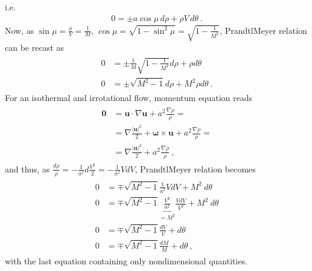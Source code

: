 \documentclass[letterpaper,10pt,english]{jupyterBook}
\begin{document}
\sphinxAtStartPar
i.e.
\begin{equation*}
\begin{split}0 = \pm a \cos \mu \, d \rho + \rho V \, d \theta \ .\end{split}
\end{equation*}
\sphinxAtStartPar
Now, as \(\sin \mu = \frac{a}{V} = \frac{1}{M}\), \(\cos \mu = \sqrt{ 1 - \sin^2 \mu } = \sqrt{ 1 - \frac{1}{M^2} }\), Prandtl\sphinxhyphen{}Meyer relation can be recast as
\begin{equation*}
\begin{split}\begin{aligned}
  0 & = \pm \frac{1}{M} \sqrt{ 1 - \frac{1}{M^2} } d \rho + \rho d \theta \\
  0 & = \pm \sqrt{ M^2 - 1 } d \rho + M^2 \rho d \theta  \ .
\end{aligned}\end{split}
\end{equation*}
\sphinxAtStartPar
For an isothermal and irrotational flow, momentum equation reads
\begin{equation*}
\begin{split}\begin{aligned}
  \mathbf{0}
  & = \mathbf{u} \cdot \nabla \mathbf{u} + a^2 \frac{\nabla \rho}{\rho} = \\
  & = \nabla \frac{|\mathbf{u}|^2}{2} + \boldsymbol\omega \times \mathbf{u} + a^2 \frac{\nabla \rho}{\rho} = \\
  & = \nabla \frac{|\mathbf{u}|^2}{2} + a^2 \frac{\nabla \rho}{\rho} \ ,
\end{aligned}\end{split}
\end{equation*}
\sphinxAtStartPar
and thus, as \(\frac{d \rho}{\rho} = - \frac{1}{a^2} d \frac{V^2}{2} = - \frac{1}{a^2} V dV\), Prandtl\sphinxhyphen{}Meyer relation becomes
\begin{equation*}
\begin{split}\begin{aligned}
  0 & = \mp \sqrt{ M^2 - 1 } \frac{1}{a^2} V dV + M^2 \ d \theta  \\
  0 & = \mp \sqrt{ M^2 - 1 } \underbrace{\frac{V^2}{a^2}}_{ = M^2} \frac{V dV}{V^2} + M^2 \ d \theta  \\
  0 & = \mp \sqrt{ M^2 - 1 } \frac{dV}{V} + d \theta  \\
  0 & = \mp \sqrt{ M^2 - 1 } \frac{d M}{M} + d \theta  \ ,
\end{aligned}\end{split}
\end{equation*}
\sphinxAtStartPar
with the last equation containing only non\sphinxhyphen{}dimensional quantities.
\end{document}
